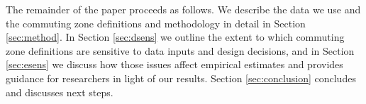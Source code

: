 The remainder of the paper proceeds as follows. We describe the data we use and the commuting zone definitions and methodology in detail in Section \ref{sec:method}. In Section \ref{sec:dsens} we outline the extent to which commuting zone definitions are sensitive to data inputs and design decisions, and in Section \ref{sec:esens} we discuss how those issues affect empirical estimates and provides guidance for researchers in light of our results. Section \ref{sec:conclusion} concludes and discusses next steps. 


